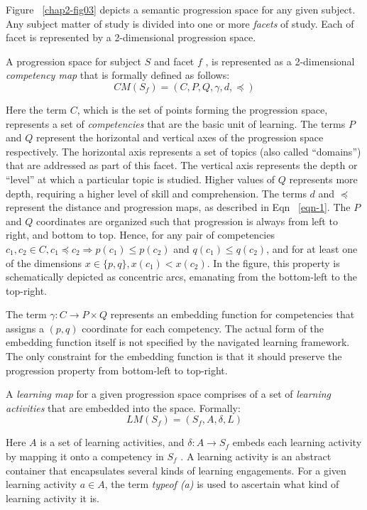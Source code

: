 \begin{multicols}{2}
Figure ~\ref{chap2-fig03} depicts a semantic progression space for any given subject. Any subject matter of study is divided into one or more \textit{facets} of study. Each of facet is represented by a 2-dimensional progression space.

A progression space for subject $S$ and facet $f$ , is represented as a 2-dimensional \textit{competency map} that is formally defined as follows:
\begin{equation}
CM(S_f)=(C, P, Q ,\gamma , d,\preceq)\label{eqn-2}
\end{equation}

Here the term $C$, which is the set of points forming the progression space, represents a set of \textit{competencies} that are the basic unit of learning. The terms $P$ and $Q$ represent the horizontal and vertical axes of the progression space respectively. The horizontal axis represents a set of topics (also called “domains”) that are addressed as part of this facet. The vertical axis represents the depth or “level” at which a particular topic is studied. Higher values of $Q$ represents more depth, requiring a higher level of skill and comprehension. The terms $d$ and $\preceq$ represent the distance and progression maps, as described in Eqn ~\ref{eqn-1}. The $P$ and $Q$ coordinates are organized such that progression is always from left to right, and bottom to top. Hence, for any pair of competencies $c_1 , c_2 \in C, c_1 \preceq c_2 \Rightarrow p(c_1 )\leq p(c_2 )$ and $q(c_1 ) \leq q(c_2 )$, and for at least one of the dimensions $x \in \{p, q\}, x(c_1 ) < x(c_2 )$. In the figure, this property is schematically depicted as concentric arcs, emanating from the bottom-left to the top-right.

The term $\gamma : C \rightarrow P \times Q$ represents an embedding function for competencies that assigns a $(p, q)$ coordinate for each competency. The actual form of the embedding function itself is not specified by the navigated learning framework. The only constraint for the embedding function is that it should preserve the progression property from bottom-left to top-right.

A \textit{learning map} for a given progression space comprises of a set of \textit{learning activities} that are embedded into the space. Formally:
\begin{equation}
LM(S_f ) = (S_f , A, \delta, L)\label{eqn-3}
\end{equation}

Here $A$ is a set of learning activities, and $\delta : A \rightarrow S_f $ embeds each learning activity by mapping it onto a competency in $S_f$ . A learning activity is an abstract container that encapsulates several kinds of learning engagements. For a given learning activity $a \in A$, the term \textit{typeof (a)} is used to ascertain what kind of learning activity it is.


\end{multicols}
